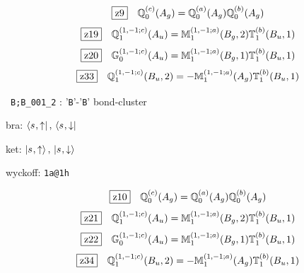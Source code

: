 \documentclass[fleqn,10pt,landscape]{jsarticle}
\begin{document}
\begin{dmath*}
\hspace*{3mm}\fbox{z9}\quad \mathbb{Q}_{0}^{(c)}(A_{g})=\mathbb{Q}_{0}^{(a)}(A_{g}) \mathbb{Q}_{0}^{(b)}(A_{g})
\end{dmath*}
\begin{dmath*}
\hspace*{3mm}\fbox{z19}\quad \mathbb{Q}_{1}^{(1,-1;c)}(A_{u})=\mathbb{M}_{1}^{(1,-1;a)}(B_{g},2) \mathbb{T}_{1}^{(b)}(B_{u},1)
\end{dmath*}
\begin{dmath*}
\hspace*{3mm}\fbox{z20}\quad \mathbb{G}_{0}^{(1,-1;c)}(A_{u})=\mathbb{M}_{1}^{(1,-1;a)}(B_{g},1) \mathbb{T}_{1}^{(b)}(B_{u},1)
\end{dmath*}
\begin{dmath*}
\hspace*{3mm}\fbox{z33}\quad \mathbb{Q}_{1}^{(1,-1;c)}(B_{u},2)=- \mathbb{M}_{1}^{(1,-1;a)}(A_{g}) \mathbb{T}_{1}^{(b)}(B_{u},1)
\end{dmath*}
\vspace{5mm}

\noindent\textbullet\, \texttt{B;B_001_2} : '\texttt{B}'-'\texttt{B}' bond-cluster

\noindent\quad * bra: $\bra{s_{},\uparrow},\, \bra{s_{},\downarrow}$

\noindent\quad * ket: $\ket{s_{},\uparrow},\, \ket{s_{},\downarrow}$

\noindent\quad * wyckoff: \texttt{1a@1h}

\begin{dmath*}
\hspace*{3mm}\fbox{z10}\quad \mathbb{Q}_{0}^{(c)}(A_{g})=\mathbb{Q}_{0}^{(a)}(A_{g}) \mathbb{Q}_{0}^{(b)}(A_{g})
\end{dmath*}
\begin{dmath*}
\hspace*{3mm}\fbox{z21}\quad \mathbb{Q}_{1}^{(1,-1;c)}(A_{u})=\mathbb{M}_{1}^{(1,-1;a)}(B_{g},2) \mathbb{T}_{1}^{(b)}(B_{u},1)
\end{dmath*}
\begin{dmath*}
\hspace*{3mm}\fbox{z22}\quad \mathbb{G}_{0}^{(1,-1;c)}(A_{u})=\mathbb{M}_{1}^{(1,-1;a)}(B_{g},1) \mathbb{T}_{1}^{(b)}(B_{u},1)
\end{dmath*}
\begin{dmath*}
\hspace*{3mm}\fbox{z34}\quad \mathbb{Q}_{1}^{(1,-1;c)}(B_{u},2)=- \mathbb{M}_{1}^{(1,-1;a)}(A_{g}) \mathbb{T}_{1}^{(b)}(B_{u},1)
\end{dmath*}
\vspace{5mm}
\end{document}
